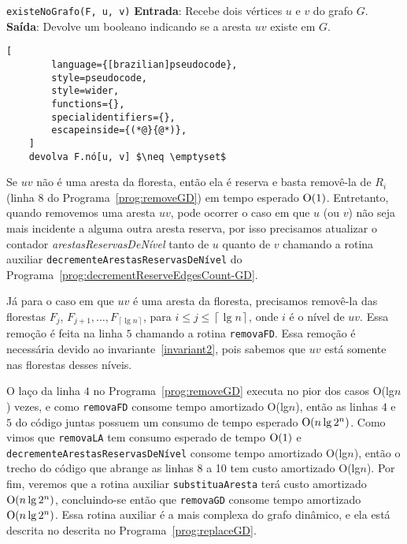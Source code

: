 \begin{programruledcaption}{\texttt{existeNoGrafo(F, u, v)} \label{prog:existGD}}
    \noindent\textbf{Entrada}: Recebe dois vértices $u$ e $v$ do grafo $G$. \\
    \textbf{Saída}: Devolve um booleano indicando se a aresta $uv$ existe em $G$.
    \vspace{-0.5\baselineskip}
    \begin{lstlisting}[
        language={[brazilian]pseudocode},
        style=pseudocode,
        style=wider,
        functions={},
        specialidentifiers={},
        escapeinside={(*@}{@*)},
    ]
    devolva F.nó[u, v] $\neq \emptyset$ 
    \end{lstlisting}
    \vspace{-0.5\baselineskip}
\end{programruledcaption}

Se $uv$ não é uma aresta da floresta, então ela é reserva e basta removê-la de $R_i$ (linha $8$ do Programa~\ref{prog:removeGD}) em tempo esperado $\mathrm{O}(1)$. Entretanto, quando removemos uma aresta $uv$, pode ocorrer o caso em que $u$ (ou $v$) não seja mais incidente a alguma outra aresta reserva, por isso precisamos atualizar o contador \textit{arestasReservasDeNível} tanto de $u$ quanto de $v$ chamando a rotina auxiliar \texttt{decrementeArestasReservasDeNível} do Programa~\ref{prog:decrementReserveEdgesCount-GD}.

Já para o caso em que $uv$ é uma aresta da floresta, precisamos removê-la das florestas $F_j$, $F_{j+1}, \ldots, F_{\left\lceil \lg n \right\rceil}$, para $i \leq j \leq \left\lceil \lg n \right\rceil$, onde $i$ é o nível de $uv$. Essa remoção é feita na linha $5$ chamando a rotina \texttt{removaFD}. Essa remoção é necessária devido ao invariante~\ref{invariant2}, pois sabemos que $uv$ está somente nas florestas desses níveis. 

O laço da linha $4$ no Programa~\ref{prog:removeGD} executa no pior dos casos O(lg$n$) vezes, e como \texttt{removaFD} consome tempo amortizado O(lg$n$), então as linhas $4$ e $5$ do código juntas possuem um consumo de tempo esperado $\mathrm{O}(n \lg 2^n)$. Como vimos que \texttt{removaLA} tem consumo esperado de tempo $\mathrm{O}(1)$ e \texttt{decrementeArestasReservasDeNível} consome tempo amortizado O(lg$n$), então o trecho do código que abrange as linhas 8 a 10 tem custo amortizado O(lg$n$). Por fim, veremos que a rotina auxiliar \texttt{substituaAresta} terá custo amortizado $\mathrm{O}(n \lg 2^n)$, concluindo-se então que \texttt{removaGD} consome tempo amortizado $\mathrm{O}(n \lg 2^n)$. Essa rotina auxiliar é a mais complexa do grafo dinâmico, e ela está descrita no descrita no Programa~\ref{prog:replaceGD}.

